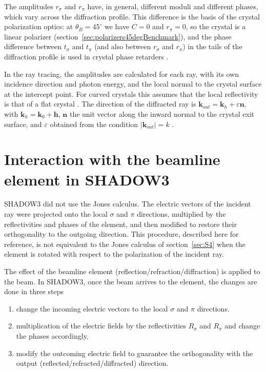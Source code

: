 \documentclass{iucr}
\begin{document}
The amplitudes $r_\sigma$ and $r_\pi$ have, in general, different moduli and different phases, which vary across the diffraction profile. This difference is the basis of the crystal polarization optics: at $\theta_B=45^\circ$ we have $C=0$ and $r_\pi=0$, so the crystal is a linear polarizer (section~\ref{sec:polarizers45degBenchmark}), and the phase difference between $t_\sigma$ and $t_\pi$ (and also between $r_\sigma$ and $r_\pi$) in the tails of the diffraction profile is used in crystal phase retarders \cite{PolarizationDraft}.

In the ray tracing, the amplitudes are calculated for each ray, with its own incidence direction and photon energy, and the local normal to the crystal surface at the intercept point. For curved crystals this assumes that the local reflectivity is that of a flat crystal \cite{Guigay2024}. The direction of the diffracted ray is $\mathbf{k}_{out}=\mathbf{k}_h+\varepsilon\mathbf{n}$, with $\mathbf{k}_h=\mathbf{k}_0+\mathbf{h}$, $\mathbf{n}$ the unit vector along the inward normal to the crystal exit surface, and $\varepsilon$ obtained from the condition $|\mathbf{k}_{out}|=k$ \cite{Guigay2024}.

\section{Interaction with the beamline element in SHADOW3}\label{sec:S3}

SHADOW3 did not use the Jones calculus. The electric vectors of the incident ray were projected onto the local $\sigma$ and $\pi$ directions, multiplied by the reflectivities and phases of the element, and then modified to restore their orthogonality to the outgoing direction. This procedure, described here for reference, is not equivalent to the Jones calculus of section~\ref{sec:S4} when the element is rotated with respect to the polarization of the incident ray.

The effect of the beamline element (reflection/refraction/diffraction) is applied to the beam. In SHADOW3, once the beam arrives to the element, the changes are done in three steps 
\begin{enumerate}
    \item change the incoming electric vectors to the local $\sigma$ and $\pi$ directions.
    \item multiplication of the electric fields by the reflectivities $R_\sigma$ and $R_\pi$ and change the phases accordingly.
    \item modify the outcoming electric field to guarantee the orthogonality with the output (reflected/refracted/diffracted) direction.
\end{enumerate}
\end{document}
